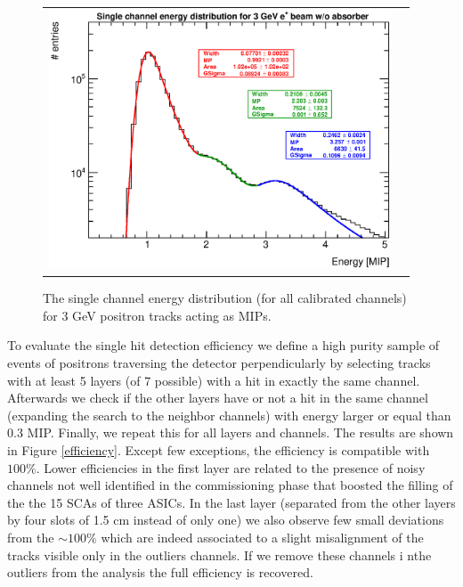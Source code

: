 \documentclass[a4paper,11pt]{article}
\begin{document}
\begin{figure}[!t]
  \centering 
    \begin{tabular}{ll}
      \includegraphics[width=4in]{figs/MIP/MIP3peaks.eps} 
    \end{tabular}
    \caption{The single channel energy distribution (for all calibrated channels) for 3 GeV positron tracks acting as MIPs.}
\label{mip3peaks}
\end{figure}

To evaluate 
the single hit detection efficiency we define a high purity sample of
events of positrons traversing the detector perpendicularly by selecting
tracks with at least 5 layers (of 7 possible) with a hit in exactly the same channel. Afterwards we 
check if the other layers have or not a hit in the same channel (expanding the search
to the neighbor channels) with energy larger or equal than 0.3 MIP.
Finally, we repeat this for all layers 
and channels. The results are shown in Figure \ref{efficiency}. Except few exceptions, the efficiency is 
compatible with $100\%$.
Lower efficiencies in the first layer are related to the presence of
noisy channels not well identified in the commissioning phase that boosted the filling
of the the 15 SCAs of three ASICs. In the last layer (separated from the
other layers by four slots of 1.5 cm instead of only one) we also observe few small deviations
from the $\sim100\%$ which are indeed
associated to a slight misalignment of the tracks visible only in the outliers channels. 
If we remove these channels i nthe outliers from the analysis
the full efficiency is recovered.
\end{document}
